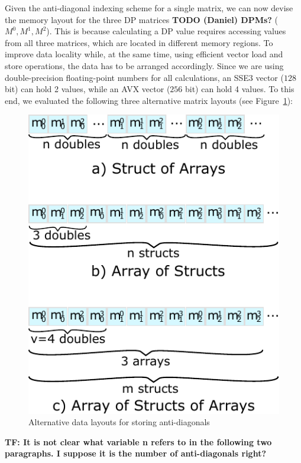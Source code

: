\documentclass[runningheads,a4paper]{llncs}
\begin{document}
Given the anti-diagonal indexing scheme for a single matrix, we can now 
devise the memory layout for the three DP matrices {\bf TODO (Daniel) DPMs?} ($M^0,M^1,M^2$).
This is because calculating a DP value requires 
accessing values from all three matrices, which are located in different
memory regions.  
To improve data locality while, at the same time, using efficient
vector load and store operations, 
the data has to be arranged accordingly.  Since we are using
double-precision floating-point numbers for all calculations, an SSE3 vector
($128$ bit) can hold 2 values, while an AVX vector ($256$ bit) can hold 4 values.
To this end, we evaluated the following three alternative matrix layouts (see Figure~\ref{fig:datalayout}):

\begin{figure}[ht!]
  \centering
  \includegraphics[scale=0.7]{figures/datalayout.pdf}
  \caption{Alternative data layouts for storing anti-diagonals}
  \label{fig:datalayout}
\end{figure}

\textbf{TF: It is not clear what variable n refers to in the following two paragraphs. I suppose it is the number of anti-diagonals right?}
\end{document}

